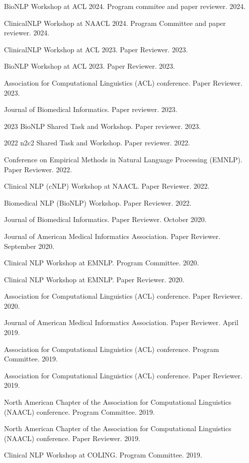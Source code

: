 \documentclass[letterpaper]{article}
\renewenvironment{itemize}{
  \begin{list}{}{
    \setlength{\leftmargin}{1.5em}
  }
}{
  \end{list}
}
\begin{document}
\begin{itemize}
\item BioNLP Workshop at ACL 2024. Program commitee and paper reviewer. 2024.
\item ClinicalNLP Workshop at NAACL 2024. Program Committee and paper reviewer. 2024.
\item ClinicalNLP Workshop at ACL 2023. Paper Reviewer. 2023.
\item BioNLP Workshop at ACL 2023. Paper Reviewer. 2023.
\item Association for Computational Linguistics (ACL) conference. Paper Reviewer. 2023.
\item Journal of Biomedical Informatics. Paper reviewer. 2023.
\item 2023 BioNLP Shared Task and Workshop. Paper reviewer. 2023.
\item 2022 n2c2 Shared Task and Workshop. Paper reviewer. 2022.
\item Conference on Empirical Methods in Natural Language Processing (EMNLP). Paper Reviewer. 2022.
\item Clinical NLP (cNLP) Workshop at NAACL. Paper Reviewer. 2022.
\item Biomedical NLP (BioNLP) Workshop. Paper Reviewer. 2022.
\item Journal of Biomedical Informatics. Paper Reviewer. October 2020.
\item Journal of American Medical Informatics Association. Paper Reviewer. September 2020.
\item Clinical NLP Workshop at EMNLP. Program Committee. 2020.
\item Clinical NLP Workshop at EMNLP. Paper Reviewer. 2020.
\item Association for Computational Linguistics (ACL) conference. Paper Reviewer. 2020.
\item Journal of American Medical Informatics Association. Paper Reviewer. April 2019.
\item Association for Computational Linguistics (ACL) conference. Program Committee. 2019.
\item Association for Computational Linguistics (ACL) conference. Paper Reviewer. 2019.
\item North American Chapter of the Association for Computational Linguistics (NAACL) conference. Program Committee. 2019.
\item North American Chapter of the Association for Computational Linguistics (NAACL) conference. Paper Reviewer. 2019.
\item Clinical NLP Workshop at COLING. Program Committee. 2019.

\end{itemize}
\end{document}
